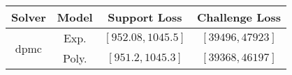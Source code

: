 \begin{tabular}{cc|c|c} 
\hline 
 Solver & Model & Support Loss  & Challenge Loss \tabularnewline\hline 
\hline 
\multirow{2}{*}{dpmc} & Exp. & $\left[952.08,1045.5\right]$ & $\left[39496,47923\right]$ \tabularnewline 
 & Poly. & $\left[951.2,1045.3\right]$ & $\left[39368,46197\right]$ \tabularnewline 
\hline 
\end{tabular} 

